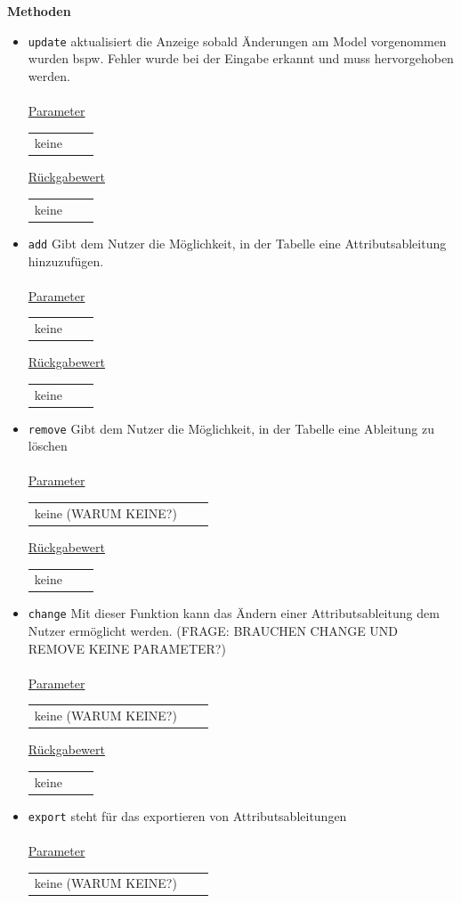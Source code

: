 \documentclass{article}
\begin{document}
\textbf{{Methoden}}
\begin{itemize}
\item \texttt{update} \newline aktualisiert die Anzeige sobald Änderungen am Model vorgenommen wurden bspw. Fehler wurde bei der Eingabe erkannt und muss hervorgehoben werden.
\\\\
\underline{{Parameter}} 
\begin{tabular}{lll}
 keine
\end{tabular}

\underline{{Rückgabewert}}
\begin{tabular}{lll}
keine
\end{tabular}
\item \texttt{add} \newline Gibt dem Nutzer die Möglichkeit, in der Tabelle eine Attributsableitung hinzuzufügen.
\\\\
\underline{{Parameter}} 
\begin{tabular}{lll}
keine
\end{tabular}

\underline{{Rückgabewert}}
\begin{tabular}{lll}
keine
\end{tabular}
\item \texttt{remove} \newline Gibt dem Nutzer die Möglichkeit, in der Tabelle eine Ableitung zu löschen
\\\\
\underline{{Parameter}} 
\begin{tabular}{lll}
keine (WARUM KEINE?)
\end{tabular}

\underline{{Rückgabewert}}
\begin{tabular}{lll}
 keine
\end{tabular}
\item \texttt{change} \newline Mit dieser Funktion kann das Ändern einer Attributsableitung dem Nutzer ermöglicht werden.
(FRAGE: BRAUCHEN CHANGE UND REMOVE KEINE PARAMETER?)
\\\\
\underline{{Parameter}} 
\begin{tabular}{lll}
keine (WARUM KEINE?)
\end{tabular}

\underline{{Rückgabewert}}
\begin{tabular}{lll}
keine
\end{tabular}
\item \texttt{export} \newline steht für das exportieren von Attributsableitungen
\\\\
\underline{{Parameter}} 
\begin{tabular}{lll}
keine (WARUM KEINE?)
\end{tabular}


\end{itemize}
\end{document}

